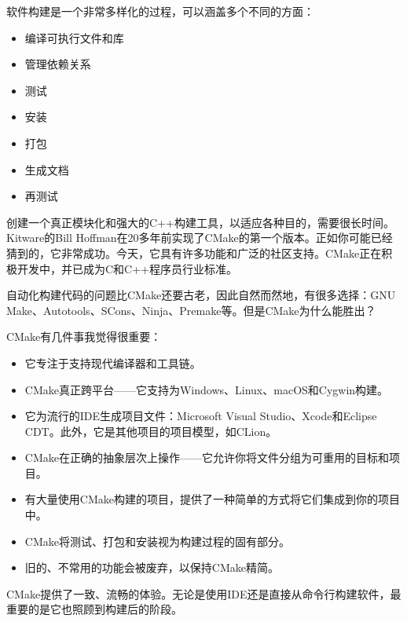 软件构建是一个非常多样化的过程，可以涵盖多个不同的方面：

\begin{itemize}
\item
编译可执行文件和库

\item
管理依赖关系

\item
测试

\item
安装

\item
打包

\item
生成文档

\item
再测试
\end{itemize}

创建一个真正模块化和强大的C++构建工具，以适应各种目的，需要很长时间。Kitware的Bill Hoffman在20多年前实现了CMake的第一个版本。正如你可能已经猜到的，它非常成功。今天，它具有许多功能和广泛的社区支持。CMake正在积极开发中，并已成为C和C++程序员行业标准。

自动化构建代码的问题比CMake还要古老，因此自然而然地，有很多选择：GNU Make、Autotools、SCons、Ninja、Premake等。但是CMake为什么能胜出？

CMake有几件事我觉得很重要：

\begin{itemize}
\item
它专注于支持现代编译器和工具链。

\item
CMake真正跨平台——它支持为Windows、Linux、macOS和Cygwin构建。

\item
它为流行的IDE生成项目文件：Microsoft Visual Studio、Xcode和Eclipse CDT。此外，它是其他项目的项目模型，如CLion。

\item
CMake在正确的抽象层次上操作——它允许你将文件分组为可重用的目标和项目。

\item
有大量使用CMake构建的项目，提供了一种简单的方式将它们集成到你的项目中。

\item
CMake将测试、打包和安装视为构建过程的固有部分。

\item
旧的、不常用的功能会被废弃，以保持CMake精简。
\end{itemize}

CMake提供了一致、流畅的体验。无论是使用IDE还是直接从命令行构建软件，最重要的是它也照顾到构建后的阶段。

